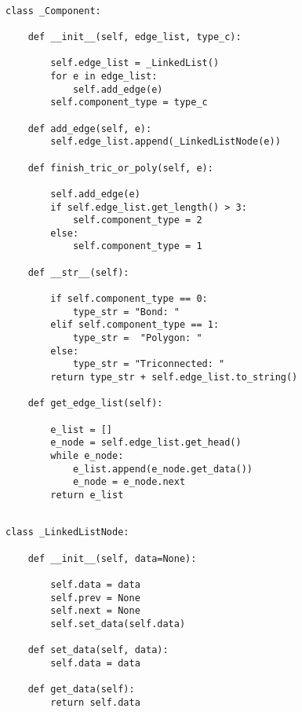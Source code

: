 \begin{verbatim}

class _Component:

	def __init__(self, edge_list, type_c):

		self.edge_list = _LinkedList()
		for e in edge_list:
			self.add_edge(e)
		self.component_type = type_c

	def add_edge(self, e):
		self.edge_list.append(_LinkedListNode(e))

	def finish_tric_or_poly(self, e):

		self.add_edge(e)
		if self.edge_list.get_length() > 3:
			self.component_type = 2
		else:
			self.component_type = 1

	def __str__(self):

		if self.component_type == 0:
			type_str = "Bond: "
		elif self.component_type == 1:
			type_str =  "Polygon: "
		else:
			type_str = "Triconnected: "
		return type_str + self.edge_list.to_string()

	def get_edge_list(self):

		e_list = []
		e_node = self.edge_list.get_head()
		while e_node:
			e_list.append(e_node.get_data())
			e_node = e_node.next
		return e_list

\end{verbatim}

\begin{verbatim}

class _LinkedListNode:

	def __init__(self, data=None):

		self.data = data
		self.prev = None
		self.next = None
		self.set_data(self.data)

	def set_data(self, data):
		self.data = data

	def get_data(self):
		return self.data

\end{verbatim}

